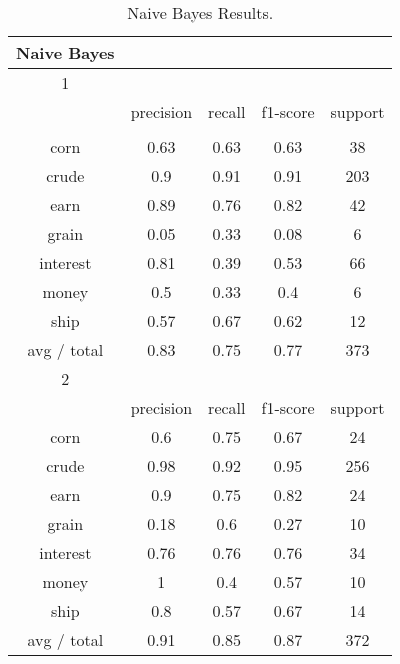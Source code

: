 \documentclass[11pt]{article}
\begin{document}
\begin{center}
\begin{longtable}{| c | c | c | c | c |}
\caption{Naive Bayes Results.} \\


\hline
Naive Bayes &           &        &          &         \\
\hline
1           &           &        &          &         \\
\hline
           & precision & recall & f1-score & support \\
           &           &        &          &         \\
corn        & 0.63      & 0.63   & 0.63     & 38      \\
crude       & 0.9       & 0.91   & 0.91     & 203     \\
earn        & 0.89      & 0.76   & 0.82     & 42      \\
grain       & 0.05      & 0.33   & 0.08     & 6       \\
interest    & 0.81      & 0.39   & 0.53     & 66      \\
money       & 0.5       & 0.33   & 0.4      & 6       \\
ship        & 0.57      & 0.67   & 0.62     & 12      \\

avg / total & 0.83      & 0.75   & 0.77     & 373     \\
\hline

2           &           &        &          &         \\
\hline
           & precision & recall & f1-score & support \\

corn        & 0.6       & 0.75   & 0.67     & 24      \\
crude       & 0.98      & 0.92   & 0.95     & 256     \\
earn        & 0.9       & 0.75   & 0.82     & 24      \\
grain       & 0.18      & 0.6    & 0.27     & 10      \\
interest    & 0.76      & 0.76   & 0.76     & 34      \\
money       & 1         & 0.4    & 0.57     & 10      \\
ship        & 0.8       & 0.57   & 0.67     & 14      \\

avg / total & 0.91      & 0.85   & 0.87     & 372     \\
\hline


\end{longtable}
\end{center}
\end{document}
